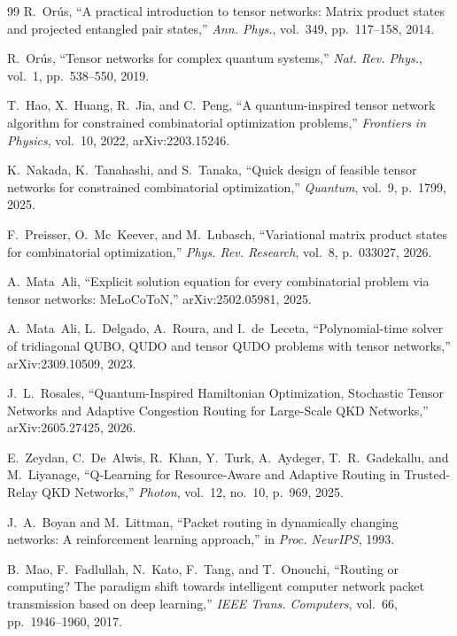 \documentclass[twocolumn]{article}
\begin{document}
\begin{thebibliography}{99}
R.~Or\'us, ``A practical introduction to tensor networks: Matrix
product states and projected entangled pair states,''
\emph{Ann. Phys.}, vol.~349, pp.~117--158, 2014.

R.~Or\'us, ``Tensor networks for complex quantum systems,''
\emph{Nat. Rev. Phys.}, vol.~1, pp.~538--550, 2019.

T.~Hao, X.~Huang, R.~Jia, and C.~Peng,
``A quantum-inspired tensor network algorithm for constrained
combinatorial optimization problems,''
\emph{Frontiers in Physics}, vol.~10, 2022, arXiv:2203.15246.

K.~Nakada, K.~Tanahashi, and S.~Tanaka,
``Quick design of feasible tensor networks for constrained
combinatorial optimization,''
\emph{Quantum}, vol.~9, p.~1799, 2025.

F.~Preisser, O.~Mc~Keever, and M.~Lubasch,
``Variational matrix product states for combinatorial optimization,''
\emph{Phys. Rev. Research}, vol.~8, p.~033027, 2026.

A.~Mata~Ali, ``Explicit solution equation for every combinatorial
problem via tensor networks: MeLoCoToN,''
arXiv:2502.05981, 2025.

A.~Mata~Ali, L.~Delgado, A.~Roura, and I.~de~Leceta,
``Polynomial-time solver of tridiagonal QUBO, QUDO and tensor QUDO
problems with tensor networks,''
arXiv:2309.10509, 2023.

J.~L.~Rosales, ``Quantum-Inspired Hamiltonian Optimization, Stochastic
Tensor Networks and Adaptive Congestion Routing for Large-Scale QKD
Networks,''
arXiv:2605.27425, 2026.

E.~Zeydan, C.~De~Alwis, R.~Khan, Y.~Turk, A.~Aydeger, T.~R.~Gadekallu,
and M.~Liyanage,
``Q-Learning for Resource-Aware and Adaptive Routing in Trusted-Relay
QKD Networks,''
\emph{Photon}, vol.~12, no.~10, p.~969, 2025.

J.~A.~Boyan and M.~Littman,
``Packet routing in dynamically changing networks: A reinforcement
learning approach,''
in \emph{Proc. NeurIPS}, 1993.

B.~Mao, F.~Fadlullah, N.~Kato, F.~Tang, and T.~Onouchi,
``Routing or computing? The paradigm shift towards intelligent computer
network packet transmission based on deep learning,''
\emph{IEEE Trans. Computers}, vol.~66, pp.~1946--1960, 2017.


\end{thebibliography}
\end{document}

